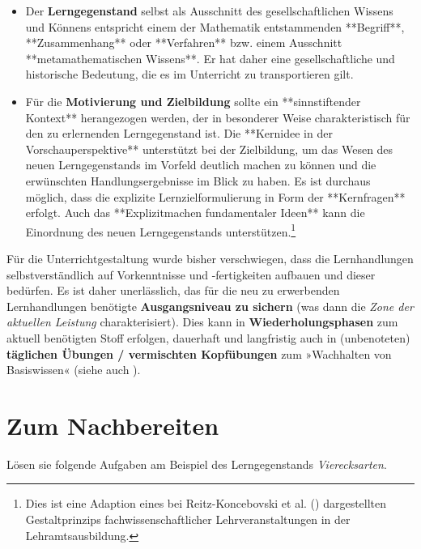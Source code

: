 \documentclass[
]{scrbook}
\theoremstyle{definition}
\theoremstyle{definition}
\theoremstyle{definition}
\theoremstyle{definition}
\theoremstyle{remark}
\begin{document}
\begin{itemize}
\item
  Der \textbf{Lerngegenstand} selbst als Ausschnitt des gesellschaftlichen Wissens und Könnens entspricht einem der Mathematik entstammenden \textcolor{formalColor}{**Begriff**, **Zusammenhang** oder **Verfahren**} bzw. einem Ausschnitt \textcolor{formalColor}{**metamathematischen Wissens**}. Er hat daher eine gesellschaftliche und historische Bedeutung, die es im Unterricht zu transportieren gilt.
\item
  Für die \textbf{Motivierung und Zielbildung} sollte ein \textcolor{concreteColor}{**sinnstiftender Kontext**} herangezogen werden, der in besonderer Weise charakteristisch für den zu erlernenden Lerngegenstand ist. Die \textcolor{concreteColor}{**Kernidee in der Vorschauperspektive**} unterstützt bei der Zielbildung, um das Wesen des neuen Lerngegenstands im Vorfeld deutlich machen zu können und die erwünschten Handlungsergebnisse im Blick zu haben. Es ist durchaus möglich, dass die explizite Lernzielformulierung in Form der \textcolor{concreteColor}{**Kernfragen**} erfolgt. Auch das \textcolor{semanticColor}{**Explizitmachen fundamentaler Ideen**} kann die Einordnung des neuen Lerngegenstands unterstützen.\footnote{Dies ist eine Adaption eines bei Reitz-Koncebovski et al. () dargestellten Gestaltprinzips fachwissenschaftlicher Lehrveranstaltungen in der Lehramtsausbildung.}
\end{itemize}

Für die Unterrichtgestaltung wurde bisher verschwiegen, dass die Lernhandlungen selbstverständlich auf Vorkenntnisse und -fertigkeiten aufbauen und dieser bedürfen. Es ist daher unerlässlich, das für die neu zu erwerbenden Lernhandlungen benötigte \textbf{Ausgangsniveau zu sichern} (was dann die \emph{Zone der aktuellen Leistung} charakterisiert). Dies kann in \textbf{Wiederholungsphasen} zum aktuell benötigten Stoff erfolgen, dauerhaft und langfristig auch in (unbenoteten) \textbf{täglichen Übungen / vermischten Kopfübungen} zum »Wachhalten von Basiswissen« (siehe auch ).

\section{Zum Nachbereiten}\label{taetigkeitstheorie-nachbereitung}

Lösen sie folgende Aufgaben am Beispiel des Lerngegenstands \emph{Vierecksarten}.
\end{document}
